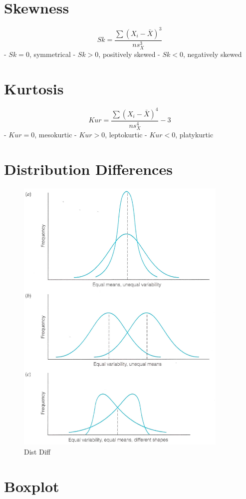 \documentclass[12pt]{article}
\begin{document}
\section{Skewness}\label{skewness}

\[Sk = \frac{\sum \left(X_{i} - \bar{X}\right)^3}{n s^3_{X}} \] -
\(Sk = 0\), symmetrical - \(Sk > 0\), positively skewed - \(Sk < 0\),
negatively skewed

\section{Kurtosis}\label{kurtosis}

\[Kur = \frac{\sum \left(X_{i} - \bar{X}\right)^4}{n s^4_{X}} - 3 \] -
\(Kur = 0\), mesokurtic - \(Kur > 0\), leptokurtic - \(Kur < 0\),
platykurtic

\section{Distribution Differences}\label{distribution-differences}

\begin{figure}[H]
\centering
\includegraphics[width=4in]{distributiondiff.png}
\caption{Dist Diff}
\end{figure}

\section{Boxplot}\label{boxplot}
\end{document}
